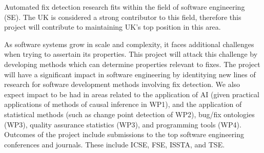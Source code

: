 Automated fix detection research fits within the field of software engineering (SE). The UK is considered a strong contributor to this field, therefore this project will contribute to maintaining UK's top position in this area. 

As software systems grow in scale and complexity, it faces additional challenges when trying to assertain its properties. This project will attack this challenge by developing methods which can determine properties relevant to fixes. 
The project will have a significant impact in software engineering by identitying new lines of research for software development methods involving fix detection. We also expect impact to be had in areas related to the application of AI (given practical applications of methods of causal inference in WP1), and the application of statistical methods (such as change point detection of WP2), bug/fix ontologies (WP3), quality assurance statistics (WP3), and programming tools (WP4). 
Outcomes of the project include submissions to the top software engineering conferences and journals. These include ICSE, FSE, ISSTA, and TSE.  
